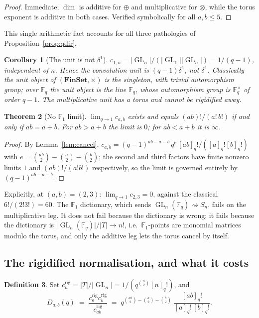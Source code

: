 \documentclass[11pt,a4paper]{article}
\newtheorem{theorem}{Theorem}[section]
\newtheorem{corollary}[theorem]{Corollary}
\theoremstyle{definition}
\newtheorem{definition}[theorem]{Definition}
\theoremstyle{remark}
\newcommand{\FF}{\mathbb{F}}
\newcommand{\cat}[1]{\mathbf{#1}}
\newcommand{\FinSet}{\cat{FinSet}}
\DeclareMathOperator{\GL}{GL}
\newcommand{\norm}[1]{\lvert #1 \rvert}
\begin{document}
\begin{proof}
Immediate; $\dim$ is additive for $\oplus$ and multiplicative for $\otimes$, while the
torus exponent is additive in both cases. Verified symbolically for all $a,b \le 5$.
\end{proof}

This single arithmetic fact accounts for all three pathologies of
Proposition~\ref{prop:qdir}.

\begin{corollary}[The unit is not $\delta^1$]
$c_{1,n} = \norm{\GL_n}/(\norm{\GL_1}\norm{\GL_n}) = 1/(q-1)$, independent of $n$. Hence
the convolution unit is $(q-1)\delta^1$, not $\delta^1$. Classically the unit object of
$(\FinSet,\times)$ is the singleton, with trivial automorphism group; over $\FF_q$ the
unit object is the line $\FF_q$, whose automorphism group is $\FF_q^\times$ of order
$q-1$. The multiplicative unit has a torus and cannot be rigidified away.
\end{corollary}

\begin{theorem}[No $\FF_1$ limit]\label{thm:nolimit}
$\lim_{q\to1} c_{a,b}$ exists and equals $(ab)!/(a!\,b!)$ if and only if $ab = a+b$. For
$ab > a+b$ the limit is $0$; for $ab < a+b$ it is $\infty$.
\end{theorem}

\begin{proof}
By Lemma~\ref{lem:cancel}, $c_{a,b} = (q-1)^{ab-a-b}\,q^{e}\,[ab]_q!/([a]_q![b]_q!)$ with
$e = \binom{ab}2 - \binom a2 - \binom b2$; the second and third factors have finite nonzero
limits $1$ and $(ab)!/(a!b!)$ respectively, so the limit is governed entirely by
$(q-1)^{ab-a-b}$.
\end{proof}

Explicitly, at $(a,b) = (2,3)$: $\lim_{q \to 1} c_{2,3} = 0$, against the classical
$6!/(2!3!) = 60$. The $\FF_1$ dictionary, which sends $\GL_n(\FF_q) \rightsquigarrow S_n$,
fails on the multiplicative leg. It does not fail because the dictionary is wrong; it
fails because the dictionary is $\norm{\GL_n(\FF_q)}/\norm{T} \to n!$, i.e.\ $\FF_1$-points
are monomial matrices modulo the torus, and only the additive leg lets the torus cancel by
itself.

\subsection{The rigidified normalisation, and what it costs}

\begin{definition}
Set $c_n^{\mathrm{rig}} = \norm{T}/\norm{\GL_n} = 1/(q^{\binom n2}[n]_q!)$, and
\[
  D_{a,b}(q) \;=\; \frac{c^{\mathrm{rig}}_a c^{\mathrm{rig}}_b}{c^{\mathrm{rig}}_{ab}}
  \;=\;
  q^{\binom{ab}{2}-\binom{a}{2}-\binom{b}{2}}\;\frac{[ab]_q!}{[a]_q!\,[b]_q!}.
\]
\end{definition}
\end{document}
